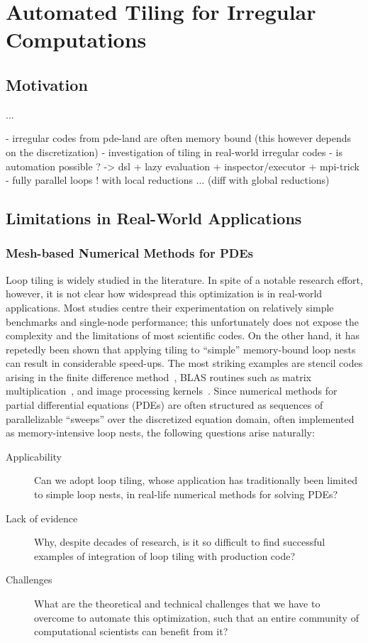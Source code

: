 \chapter{Automated Tiling for Irregular Computations}
\label{ch:sparsetiling}

\section{Motivation}
...

- irregular codes from pde-land are often memory bound (this however depends on the discretization)
- investigation of tiling in real-world irregular codes
- is automation possible ? -> dsl + lazy evaluation + inspector/executor + mpi-trick
- fully parallel loops ! with local reductions ... (diff with global reductions)

\section{Limitations in Real-World Applications}
\label{sec:tiling:limits}

\subsection{Mesh-based Numerical Methods for PDEs}
Loop tiling is widely studied in the literature. In spite of a notable research effort, however, it is not clear how widespread this optimization is in real-world applications. Most studies centre their experimentation on relatively simple benchmarks and single-node performance; this unfortunately does not expose the complexity and the limitations of most scientific codes. On the other hand, it has repetedly been shown that applying tiling to ``simple'' memory-bound loop nests can result in considerable speed-ups. The most striking examples are stencil codes arising in the finite difference method~\cite{stencil-tiling}, BLAS routines such as matrix multiplication~\cite{MKL}, and image processing kernels~\cite{Halide}. Since numerical methods for partial differential equations (PDEs) are often structured as sequences of parallelizable ``sweeps'' over the discretized equation domain, often implemented as memory-intensive loop nests, the following questions arise naturally: 

\begin{description}
\item[Applicability] Can we adopt loop tiling, whose application has traditionally been limited to simple loop nests, in real-life numerical methods for solving PDEs?
\item[Lack of evidence] Why, despite decades of research, is it so difficult to find successful examples of integration of loop tiling with production code? 
\item[Challenges] What are the theoretical and technical challenges that we have to overcome to automate this optimization, such that an entire community of computational scientists can benefit from it?
\end{description}

